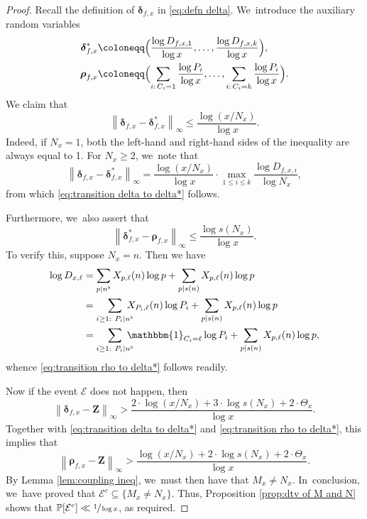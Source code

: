 \documentclass[10pt]{amsart}
\newcommand{\bZ}{{\boldsymbol Z}}
\newcommand{\PP}{\mathbb{P}}
\newcommand{\bolddelta}{\boldsymbol{\delta}}
\newcommand{\boldrho}{\boldsymbol{\rho}}
\newcommand{\one}{\mathbbm{1}}
\newcommand{\maxnorm}[1]{\left\| #1 \right\|_{\infty}}
\theoremstyle{plain}
\theoremstyle{definition}
\begin{document}
\begin{proof}
Recall the definition of $\bolddelta_{f, x}$ in \eqref{eq:defn delta}. We~introduce the auxiliary random variables
\begin{equation}
\label{eq:defn delta* and rho}
\begin{aligned}
\bolddelta_{f, x}^* &\coloneqq \Bigl(\frac{\log D_{f,x,1}}{\log x}, \ldots, \frac{\log D_{f,x,k}}{\log x} \Bigr),\\
\boldrho_{f, x} &\coloneqq \Bigl(\sum_{i:\, C_i=1} \frac{\log P_i}{\log x}, \ldots, \sum_{i:\, C_i=k} \frac{\log P_i}{\log x} \Bigr).
\end{aligned}
\end{equation}
We claim that
\begin{equation}
\label{eq:transition delta to delta*}
\maxnorm{ \bolddelta_{f, x} - \bolddelta_{f, x}^*} \le \frac{\log(x/N_x)}{\log x}.
\end{equation}
Indeed, if $N_x = 1$, both the left-hand and right-hand sides of the inequality are always equal to 1. For $N_x \ge 2$, we~note that
\[
\maxnorm{ \bolddelta_{f, x} - \bolddelta_{f, x}^*} = \frac{\log(x/N_x)}{\log x} \cdot \max_{1 \le i \le k} \frac{\log D_{f,x,i}}{\log N_x},
\]
from which \eqref{eq:transition delta to delta*} follows.

Furthermore, we~also assert that
\begin{equation}
\label{eq:transition rho to delta*}
\maxnorm{\bolddelta_{f, x}^* - \boldrho_{f, x}} \le \frac{\log s(N_x)}{\log x}.
\end{equation}
To verify this, suppose $N_x=n$. Then we have
\begin{align*}
\log D_{x,\ell} &= \sum_{p|n^\flat} X_{p, \ell}(n) \log p + \sum_{p|s(n)} X_{p, \ell}(n) \log p \\
&=\sum_{i\ge1:\ P_i|n^\flat}\hspace*{-3mm} X_{P_i, \ell}(n) \log P_i + \sum_{p|s(n)} X_{p,\ell}(n) \log p \\
&=\sum_{i\ge1:\ P_i|n^\flat}\hspace*{-3mm} \one_{C_i=\ell} \log P_i + \sum_{p|s(n)} X_{p,\ell}(n) \log p,
\end{align*}
whence \eqref{eq:transition rho to delta*} follows readily.

Now if the event $\mathcal E$ does not happen, then
\[
\maxnorm{\bolddelta_{f, x} - \bZ} > \frac{2 \cdot \log(x/N_x) + 3 \cdot \log s(N_x) + 2\cdot \Theta_x}{\log x}.
\]
Together with \eqref{eq:transition delta to delta*} and \eqref{eq:transition rho to delta*}, this implies that
\[
\maxnorm{\boldrho_{f, x} - \bZ} > \frac{\log(x/N_x) + 2 \cdot \log s(N_x) + 2\cdot \Theta_x}{\log x}.
\]
By Lemma \ref{lem:coupling ineq}, we~must then have that $M_x \ne N_x$. In~conclusion, we~have proved that $\mathcal{E}^c\subseteq\{M_x\ne N_x\}$. Thus, Proposition \ref{prop:dtv of M and N} shows that $\PP[\mathcal E^c] \ll \sfrac{1}{\log x}$, as required.
\end{proof}
\end{document}
